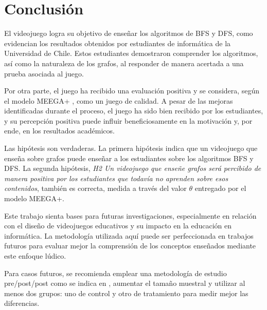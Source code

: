 \chapter{Conclusión}

El videojuego logra su objetivo de enseñar los algoritmos de BFS y DFS, como evidencian los resultados obtenidos por estudiantes de informática de la Universidad de Chile. Estos estudiantes demostraron comprender los algoritmos, así como la naturaleza de los grafos, al responder de manera acertada a una prueba asociada al juego.

Por otra parte, el juego ha recibido una evaluación positiva y se considera, según el modelo MEEGA+ \cite{meegaplus}, como un juego de calidad. A pesar de las mejoras identificadas durante el proceso, el juego ha sido bien recibido por los estudiantes, y su percepción positiva puede influir beneficiosamente en la motivación y, por ende, en los resultados académicos.

Las hipótesis son verdaderas. La primera hipótesis indica que un videojuego que enseña sobre grafos puede enseñar a los estudiantes sobre los algoritmos BFS y DFS. La segunda hipótesis, \emph{H2 Un videojuego que enseñe grafos será percibido de manera positiva por los estudiantes que todavía no aprenden sobre esos contenidos}, también es correcta, medida a través del valor $\theta$ entregado por el modelo MEEGA+.

Este trabajo sienta bases para futuras investigaciones, especialmente en relación con el diseño de videojuegos educativos y su impacto en la educación en informática. La metodología utilizada aquí puede ser perfeccionada en trabajos futuros para evaluar mejor la comprensión de los conceptos enseñados mediante este enfoque lúdico.

Para casos futuros, se recomienda emplear una metodología de estudio pre/post/post como se indica en \cite{HowGamesComputingEducationEvaluated}, aumentar el tamaño muestral y utilizar al menos dos grupos: uno de control y otro de tratamiento para medir mejor las diferencias. 





